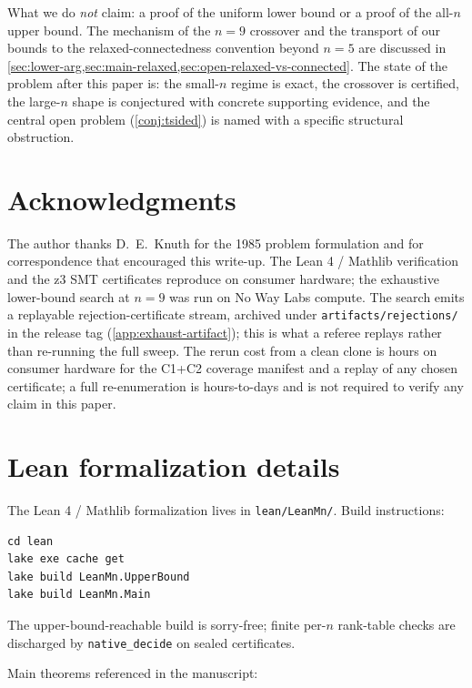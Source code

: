 \documentclass[11pt,a4paper]{article}
\theoremstyle{plain}
\theoremstyle{definition}
\begin{document}
What we do \emph{not} claim: a proof of the uniform lower bound or
a proof of the all-$n$ upper bound.  The mechanism of the $n = 9$
crossover and the transport of our bounds to the
relaxed-connectedness convention beyond $n = 5$ are discussed in
\cref{sec:lower-arg,sec:main-relaxed,sec:open-relaxed-vs-connected}.
The state of the problem after this paper is: the small-$n$ regime
is exact, the crossover is certified, the large-$n$ shape is
conjectured with concrete supporting evidence, and the central
open problem (\cref{conj:tsided}) is named with a specific
structural obstruction.

\section*{Acknowledgments}

The author thanks D.~E.~Knuth for the 1985 problem formulation
and for correspondence that encouraged this write-up.  The Lean 4
/ Mathlib verification and the z3 SMT certificates reproduce on
consumer hardware; the exhaustive lower-bound search at $n = 9$
was run on No Way Labs compute.  The search emits a replayable
rejection-certificate stream, archived under
\texttt{artifacts/rejections/} in the release tag
(\cref{app:exhaust-artifact}); this is what a referee replays
rather than re-running the full sweep.  The rerun cost from a
clean clone is hours on consumer hardware for the C1+C2 coverage
manifest and a replay of any chosen certificate; a full
re-enumeration is hours-to-days and is not required to verify any
claim in this paper.

\appendix

\section{Lean formalization details}\label{app:lean}

The Lean 4 / Mathlib formalization lives in
\texttt{lean/LeanMn/}.  Build instructions:
\begin{verbatim}
cd lean
lake exe cache get
lake build LeanMn.UpperBound
lake build LeanMn.Main
\end{verbatim}
The upper-bound-reachable build is sorry-free; finite per-$n$ rank-table
checks are discharged by \texttt{native\_decide} on sealed certificates.

Main theorems referenced in the manuscript:
\end{document}
